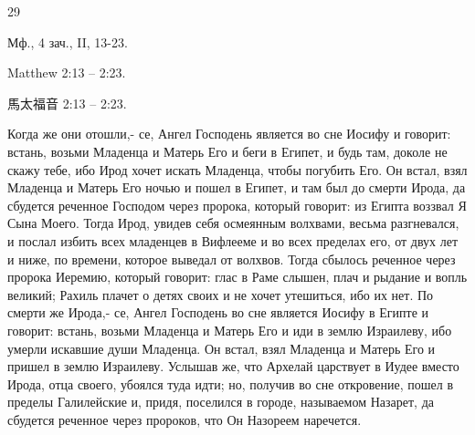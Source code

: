 29

\singlespacing %

\singlespacing %

\large

Мф., 4 зач., II, 13-23.

Matthew 2:13 -- 2:23.

馬太福音 2:13 -- 2:23.

Когда же они отошли,- се, Ангел Господень является во сне Иосифу и говорит: встань, возьми Младенца и Матерь Его и беги в Египет, и будь там, доколе не скажу тебе, ибо Ирод хочет искать Младенца, чтобы погубить Его.
Он встал, взял Младенца и Матерь Его ночью и пошел в Египет,
и там был до смерти Ирода, да сбудется реченное Господом через пророка, который говорит: из Египта воззвал Я Сына Моего.
Тогда Ирод, увидев себя осмеянным волхвами, весьма разгневался, и послал избить всех младенцев в Вифлееме и во всех пределах его, от двух лет и ниже, по времени, которое выведал от волхвов.
Тогда сбылось реченное через пророка Иеремию, который говорит:
глас в Раме слышен, плач и рыдание и вопль великий; Рахиль плачет о детях своих и не хочет утешиться, ибо их нет.
По смерти же Ирода,- се, Ангел Господень во сне является Иосифу в Египте
и говорит: встань, возьми Младенца и Матерь Его и иди в землю Израилеву, ибо умерли искавшие души Младенца.
Он встал, взял Младенца и Матерь Его и пришел в землю Израилеву.
Услышав же, что Архелай царствует в Иудее вместо Ирода, отца своего, убоялся туда идти; но, получив во сне откровение, пошел в пределы Галилейские
и, придя, поселился в городе, называемом Назарет, да сбудется реченное через пророков, что Он Назореем наречется. 

